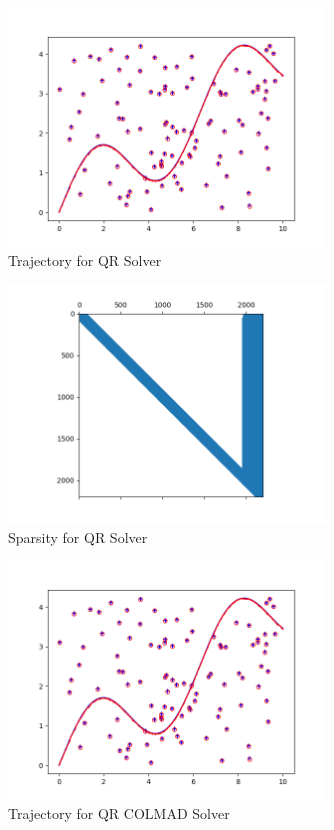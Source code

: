 \documentclass[12pt, a4paper]{article}
\begin{document}
\begin{figure}
    \center
    \includegraphics[width=0.75\textwidth]{linear_results/QR_Traj.png}
    \caption{Trajectory for QR Solver}
\end{figure}

\begin{figure}
    \center
    \includegraphics[width=0.75\textwidth]{linear_results/QR_Sparsity.png}
    \caption{Sparsity for QR Solver}
\end{figure}

\begin{figure}
    \center
    \includegraphics[width=0.75\textwidth]{linear_results/QR_COLAMD_Traj.png}
    \caption{Trajectory for QR COLMAD Solver}
\end{figure}
\end{document}
